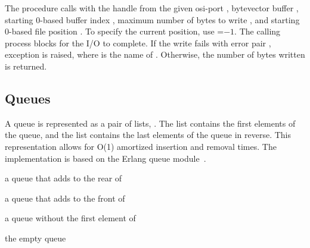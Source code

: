 The  procedure calls  with
the handle from the given osi-port , bytevector buffer
, starting 0-based buffer index , maximum number of
bytes to write , and starting 0-based file position
. To specify the current position, use =$-1$. The
calling process blocks for the I/O to complete. If the write fails
with error pair , exception
 is raised, where
 is the name of . Otherwise, the number of bytes
written is returned.

\subsection {Queues}

A queue is represented as a pair of lists,
. The  list contains the first
elements of the queue, and the  list contains the last
elements of the queue in reverse. This representation allows for O(1)
amortized insertion and removal times. The implementation is based on
the Erlang queue module~\cite{queue-ref}.

\begin{procedure}
\end{procedure}
\returns{} a queue that adds  to the rear of 

\begin{procedure}
\end{procedure}
\returns{} a queue that adds  to the front of 

\begin{procedure}
\end{procedure}
\returns{} a queue without the first element of 

\begin{syntax}
\end{syntax}
\returns{} the empty queue

